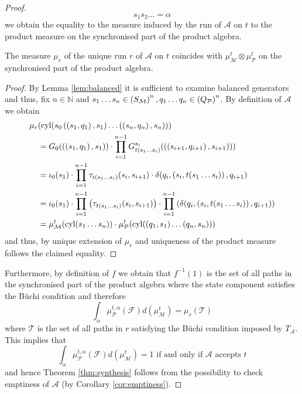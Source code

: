 \begin{proof}
\begin{equation*}
{  s_{1}s_{2}\dots = \alpha}
\end{equation*}
we obtain the equality to the measure induced by the run of $\mathcal{A}$ on
$t$ to the product measure on the synchronised part of the product algebra.
\begin{lemma}
  The measure $\mu_{r}$ of the unique run $r$ of $\mathcal{A}$ on $t$ coincides
  with $\mu_{\mathcal{M}}^{t}\otimes\mu_{\mathcal{P}}^{t}$ on the synchronised
  part of the product algebra.
  \label{lem:productmeasure}
\end{lemma}
\begin{proof}
  By Lemma \ref{lem:balanced} it is sufficient to examine balanced generators
  and thus, fix $n\in\mathbb{N}$ and $s_{1}\dots s_{n}
  \in\left(S_{\mathcal{M}}\right)^{n},
  q_{1}\dots q_{n}\in\left(Q_{\mathcal{P}}\right)^{n}$. By definition of
  $\mathcal{A}$ we obtain
  \begin{align*}
    \mu_{r}&(\operatorname{cyl}(s_{0}\left(\left(s_{1},q_{1}\right), s_{1}\right)\dots\left(\left(s_{n},q_{n}\right), s_{n}\right)))\\
    &= G_{0}(\left(\left(s_{1},q_{1}\right), s_{1}\right))\cdot\prod\limits_{i = 1}^{n-1}
    G^{s_{i}}_{t(s_{1}\dots s_{i})}(\left(\left(s_{i+1},q_{i+1}\right), s_{i+1}\right)))\\
    &=\iota_{0}(s_{1})\cdot\prod\limits_{i = 1}^{n-1}
    \tau_{t(s_{1}\dots s_{i})}(s_{i}, s_{i+1})\cdot
    \delta(q_{i}, \left(s_{i}, t(s_{1}\dots s_{i})\right), q_{i+1})\\
    &=\iota_{0}(s_{1})\cdot\prod\limits_{i = 1}^{n-1}\left(
      \tau_{t(s_{1}\dots s_{i})}(s_{i}, s_{i+1})\right)
    \cdot\prod\limits_{i = 1}^{n-1}\left(
      \delta(q_{i}, \left(s_{i}, t(s_{1}\dots s_{i})\right), q_{i+1})\right)\\
    &=\mu_{\mathcal{M}}^{t}(\operatorname{cyl}(s_{1}\dots s_{n}))\cdot
      \mu_{\mathcal{P}}^{t}(\operatorname{cyl}(\left(q_{1},s_{1}\right)\dots\left(q_{n},s_{n}\right)))
  \end{align*}
  and thus, by unique extension of $\mu_{r}$ and uniqueness of the product
  measure \cite[Theorem 5.6, Theorem 22.2]{Bauer} follows the claimed equality.
\end{proof}
Furthermore, by definition of $f$ we obtain that $f^{-1}(1)$ is the set of all
paths in the synchronised part of the product algebra where the state component
satisfies the Büchi condition and therefore
\begin{equation*}
  \int_{\alpha}\mu_{\mathcal{P}}^{t,\alpha}(\mathcal{F})
  d(\mu_{\mathcal{M}}^{t}) = \mu_{r}(\mathcal{T})
\end{equation*}
where $\mathcal{T}$ is the set of all paths in $r$ satisfying the Büchi
condition imposed by $T_{\mathcal{A}}$. This implies that
\begin{equation*}
  \int_{\alpha}\mu_{\mathcal{P}}^{t,\alpha}(\mathcal{F})
  d(\mu_{\mathcal{M}}^{t}) = 1\text{ if and only if }\mathcal{A}
  \text{ accepts } t
\end{equation*}
and hence Theorem \ref{thm:synthesis} follows from the possibility to check
emptiness of $\mathcal{A}$ (by Corollary \ref{cor:emptiness}).
\end{proof}

